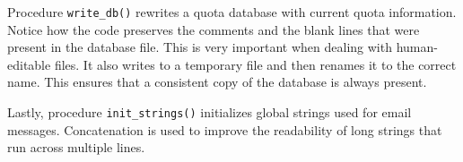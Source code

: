 Procedure \texttt{write\_db()} rewrites a quota database with current
quota information. Notice how the code preserves the
comments and the blank lines that were present in the
database file. This is very important when dealing with human-editable
files. It also writes to a temporary file and then renames it to the
correct name. This ensures that a consistent copy of the database is
always present.


Lastly, procedure \texttt{init\_strings()} initializes global strings
used for email messages. Concatenation is used to improve the
readability of long strings that run across multiple lines.

